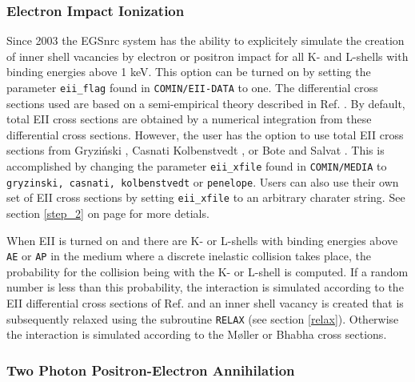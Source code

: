 \subsubsection{Electron Impact Ionization}
\label{discrete_eii}
\setcounter{equation}{0}

Since 2003 the EGSnrc system has the ability to explicitely
simulate the creation of inner shell vacancies by electron or positron
impact for all K- and L-shells with binding energies above 1 keV.
This option can be turned on by setting the parameter {\tt eii\_flag} found
in {\tt COMIN/EII-DATA} to one. The differential cross sections used are
based on a semi-empirical theory described in Ref. \cite{Ka02b}. By default,
total EII cross sections are obtained by a numerical integration from these
differential cross sections. However, the user has the option to use
total EII cross sections from Gryzi\'{n}ski \cite{Gr65a}, Casnati \cite{Ca82}
Kolbenstvedt \cite{Ko67}, or Bote and Salvat \cite{BS08}.
This is accomplished by changing the parameter
{\tt eii\_xfile} found in {\tt COMIN/MEDIA} to {\tt gryzinski, casnati, kolbenstvedt} or {\tt penelope}. Users can also use their own
set of EII cross sections by setting
{\tt eii\_xfile} to an arbitrary charater string.
See section \ref{step_2} on page \pageref{eii_xfile_description}
for more detials.

When EII is turned on and there are K- or L-shells with
binding energies above {\tt AE} or {\tt AP} in the medium where a discrete
inelastic collision takes place, the probability for the collision being
with the K- or L-shell is computed. If a random number is less than this probability,
the interaction is simulated according to the EII differential cross sections of
Ref. \cite{Ka02b} and an inner shell vacancy is created that is subsequently relaxed
using the subroutine {\tt RELAX} (see section \ref{relax}). Otherwise the
interaction is simulated according to the M{\o}ller or Bhabha cross sections.

\subsubsection{Two Photon Positron-Electron Annihilation}
\setcounter{equation}{0}
\label{annihilation}

